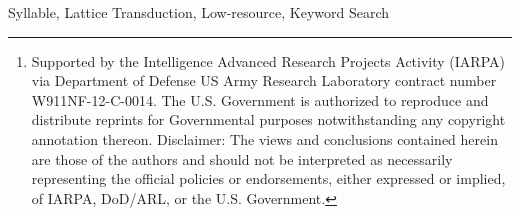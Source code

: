 \documentclass[journal]{IEEEtran}
\begin{document}

\maketitle

\begin{abstract}
Low-resource speech recognition and keyword search (KWS) are important topics for speech technologies. However,
their performance often suffer from out-of-vocabulary (OOV) keywords. Subword units like syllables are useful 
in handling this issue. This report introduces a weighted finite state transducer (WFST) based syllable transduction 
framework for OOV handling in KWS. Experiments on languages provided by the Babel project\footnote{Supported by 
the Intelligence Advanced Research Projects Activity (IARPA) via 
Department of Defense US Army Research Laboratory contract number W911NF-12-C-0014. The U.S. Government is 
authorized to reproduce and distribute reprints for Governmental purposes notwithstanding any
copyright annotation thereon. Disclaimer: The views and conclusions contained herein are those of the 
authors and should not be interpreted as necessarily representing the official policies or endorsements, 
either expressed or implied, of IARPA, DoD/ARL, or the U.S. Government.} are presented, and it is shown that 
syllable transduction can effectively spot OOV keywords. Combination of this approach with two
other OOV handling methods further improves keyword search performance.
\end{abstract}

\begin{IEEEkeywords}
Syllable, Lattice Transduction, Low-resource, Keyword Search
\end{IEEEkeywords}


%
\IEEEpeerreviewmaketitle
\end{document}
